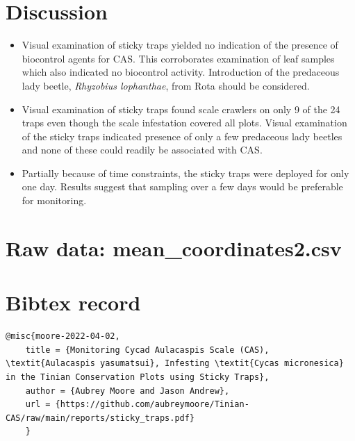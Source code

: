 \documentclass[12pt,letterpaper,english,bibliography=totocnumbered, abstract=on]{scrartcl}
\begin{document}
\section{Discussion}

\begin{itemize}

\item
Visual examination of sticky traps yielded no indication of the presence of biocontrol agents for CAS. This corroborates examination of leaf samples which also indicated no biocontrol activity. Introduction of the predaceous lady beetle, \textit{Rhyzobius lophanthae}, from Rota should be considered.

\item
Visual examination of sticky traps found scale crawlers on only 9 of the 24 traps even though the scale infestation covered all plots. Visual examination of the sticky traps indicated presence of only a few predaceous lady beetles and none of these could readily be associated with CAS.

\item
Partially because of time constraints, the sticky traps were deployed for only one day. Results suggest that sampling over a few days would be preferable for monitoring.

\end{itemize}

\clearpage
\begin{appendices}
	
	\section{Raw data: mean\_coordinates2.csv}
	\label{rawdata}
	
		
	\section{Bibtex record}
	\begin{lstlisting}[basicstyle=\small\ttfamily, breaklines=true, columns=flexible]
	@misc{moore-2022-04-02,
	title = {Monitoring Cycad Aulacaspis Scale (CAS), \textit{Aulacaspis yasumatsui}, Infesting \textit{Cycas micronesica} in the Tinian Conservation Plots using Sticky Traps},
	author = {Aubrey Moore and Jason Andrew},
	url = {https://github.com/aubreymoore/Tinian-CAS/raw/main/reports/sticky_traps.pdf} 	
	}
	\end{lstlisting}
		
\end{appendices}
\end{document}
